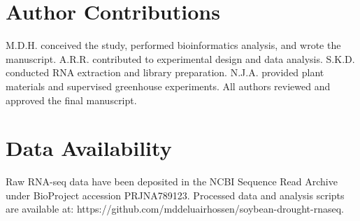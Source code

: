 \documentclass[11pt,a4paper]{article}
\begin{document}
\section*{Author Contributions}

M.D.H. conceived the study, performed bioinformatics analysis, and wrote the manuscript. A.R.R. contributed to experimental design and data analysis. S.K.D. conducted RNA extraction and library preparation. N.J.A. provided plant materials and supervised greenhouse experiments. All authors reviewed and approved the final manuscript.

\section*{Data Availability}

Raw RNA-seq data have been deposited in the NCBI Sequence Read Archive under BioProject accession PRJNA789123. Processed data and analysis scripts are available at: https://github.com/mddeluairhossen/soybean-drought-rnaseq.


\end{document}

